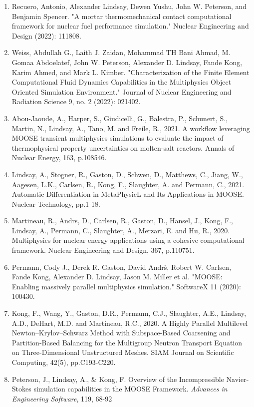 \begin{enumerate}
  \item Recuero, Antonio, Alexander Lindsay, Dewen Yushu, John W. Peterson, and Benjamin Spencer. "A mortar thermomechanical contact computational framework for nuclear fuel performance simulation." Nuclear Engineering and Design (2022): 111808.
  \item Weiss, Abdullah G., Laith J. Zaidan, Mohammad TH Bani Ahmad, M. Gomaa Abdoelatef, John W. Peterson, Alexander D. Lindsay, Fande Kong, Karim Ahmed, and Mark L. Kimber. "Characterization of the Finite Element Computational Fluid Dynamics Capabilities in the Multiphysics Object Oriented Simulation Environment." Journal of Nuclear Engineering and Radiation Science 9, no. 2 (2022): 021402.
  \item Abou-Jaoude, A., Harper, S., Giudicelli, G., Balestra, P., Schunert, S., Martin, N., Lindsay, A., Tano, M. and Freile, R., 2021. A workflow leveraging MOOSE transient multiphysics simulations to evaluate the impact of thermophysical property uncertainties on molten-salt reactors. Annals of Nuclear Energy, 163, p.108546.
  \item Lindsay, A., Stogner, R., Gaston, D., Schwen, D., Matthews, C., Jiang, W., Aagesen, L.K., Carlsen, R., Kong, F., Slaughter, A. and Permann, C., 2021. Automatic Differentiation in MetaPhysicL and Its Applications in MOOSE. Nuclear Technology, pp.1-18.
  \item Martineau, R., Andrs, D., Carlsen, R., Gaston, D., Hansel, J., Kong, F., Lindsay, A., Permann, C., Slaughter, A., Merzari, E. and Hu, R., 2020. Multiphysics for nuclear energy applications using a cohesive computational framework. Nuclear Engineering and Design, 367, p.110751.
  \item Permann, Cody J., Derek R. Gaston, David Andrš, Robert W. Carlsen, Fande Kong, Alexander D. Lindsay, Jason M. Miller et al. "MOOSE: Enabling massively parallel multiphysics simulation." SoftwareX 11 (2020): 100430.
  \item Kong, F., Wang, Y., Gaston, D.R., Permann, C.J., Slaughter, A.E., Lindsay, A.D., DeHart, M.D. and Martineau, R.C., 2020. A Highly Parallel Multilevel Newton--Krylov--Schwarz Method with Subspace-Based Coarsening and Partition-Based Balancing for the Multigroup Neutron Transport Equation on Three-Dimensional Unstructured Meshes. SIAM Journal on Scientific Computing, 42(5), pp.C193-C220.
  \item Peterson, J., Lindsay, A., \& Kong, F. Overview of the Incompressible Navier-Stokes simulation capabilities in the MOOSE Framework. \textit{Advances in Engineering Software}, 119, 68-92

\end{enumerate}
